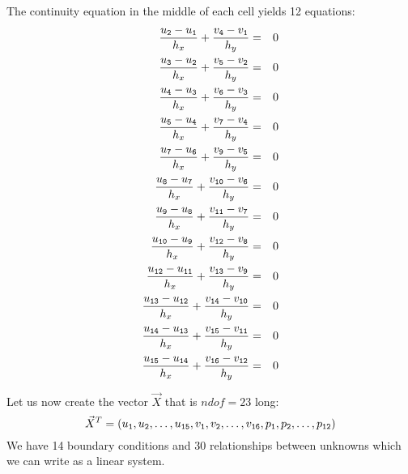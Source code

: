 The continuity equation in the middle of each cell yields 12 equations:
\begin{eqnarray}
\frac{u_{\tt 2}-u_{\tt 1}}{h_x} + \frac{v_{\tt 4}-v_{\tt 1}}{h_y} &=& 0 \\
\frac{u_{\tt 3}-u_{\tt 2}}{h_x} + \frac{v_{\tt 5}-v_{\tt 2}}{h_y} &=& 0 \\
\frac{u_{\tt 4}-u_{\tt 3}}{h_x} + \frac{v_{\tt 6}-v_{\tt 3}}{h_y} &=& 0 \\
\frac{u_{\tt 5}-u_{\tt 4}}{h_x} + \frac{v_{\tt 7}-v_{\tt 4}}{h_y} &=& 0 
\\
\frac{u_{\tt 7}-u_{\tt 6}}{h_x} + \frac{v_{\tt 9}-v_{\tt 5}}{h_y} &=& 0 \\
\frac{u_{\tt 8}-u_{\tt 7}}{h_x} + \frac{v_{\tt 10}-v_{\tt 6}}{h_y} &=& 0 \\
\frac{u_{\tt 9}-u_{\tt 8}}{h_x} + \frac{v_{\tt 11}-v_{\tt 7}}{h_y} &=& 0 \\
\frac{u_{\tt 10}-u_{\tt 9}}{h_x} + \frac{v_{\tt 12}-v_{\tt 8}}{h_y} &=& 0 
\\
\frac{u_{\tt 12}-u_{\tt 11}}{h_x} + \frac{v_{\tt 13}-v_{\tt 9}}{h_y} &=& 0 \\
\frac{u_{\tt 13}-u_{\tt 12}}{h_x} + \frac{v_{\tt 14}-v_{\tt 10}}{h_y} &=& 0 \\
\frac{u_{\tt 14}-u_{\tt 13}}{h_x} + \frac{v_{\tt 15}-v_{\tt 11}}{h_y} &=& 0 \\
\frac{u_{\tt 15}-u_{\tt 14}}{h_x} + \frac{v_{\tt 16}-v_{\tt 12}}{h_y} &=& 0 
\end{eqnarray}

Let us now create the vector $\vec{X}$ that is $ndof=23$ long:
\[
\vec{X}^T=(
u_{\tt 1},u_{\tt 2}, \dots , u_{\tt 15},
v_{\tt 1},v_{\tt 2}, \dots , v_{\tt 16},
p_{\tt 1},p_{\tt 2}, \dots, p_{\tt 12})
\]
We have 14 boundary conditions and 30 relationships between unknowns which we 
can write as a linear system.

